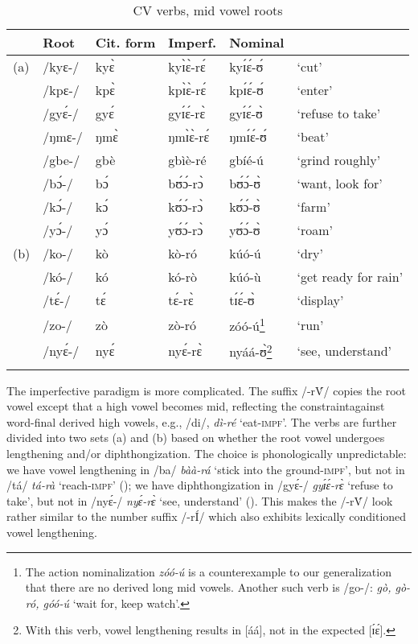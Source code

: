 \documentclass[output=paper,newtxmath,modfonts,nonflat,draftmode]{langsci/langscibook}
\begin{document}
\begin{table}[b]
\begin{tabularx}{\textwidth}{lllllX}
\lsptoprule
& {Root} & {Cit. form} & {Imperf.} & {Nominal} & \\
\midrule
(a) &	/kyɛ-/	&kyɛ̀	&kyɪ̀ɛ̀-rɛ́	&kyɪ́ɛ́-ʊ́	&‘cut’\\
	&/kpɛ-/&	kpɛ̀	&	kpɪ̀ɛ̀-rɛ́	&kpɪ́ɛ́-ʊ́	&‘enter’\\
	&/gyɛ́-/	&gyɛ́	&gyɪ́ɛ́-rɛ̀	&gyɪ́ɛ́-ʊ̀	&‘refuse to take’\\
	&/ŋmɛ-/	&ŋmɛ̀	&ŋmɪ̀ɛ̀-rɛ́	&ŋmɪ́ɛ́-ʊ́	&‘beat’\\
	&/gbe-/&	gbè	&gbìè-ré	&gbíé-ú	&‘grind roughly’\\
	&/bɔ́-/	&bɔ́	&bʊ́ɔ́-rɔ̀	&bʊ́ɔ́-ʊ̀	&‘want, look for’\\
	&/kɔ́-/	&kɔ́	&kʊ́ɔ́-rɔ̀	&kʊ́ɔ́-ʊ̀	&‘farm’\\
	&/yɔ́-/	&yɔ́	&yʊ́ɔ́-rɔ̀ &	yʊ́ɔ́-ʊ̀	&‘roam’\\
\tablevspace
(b)	&/ko-/	&kò	&kò-ró	&kúó-ú	&‘dry’\\
	&/kó-/	&kó	&kó-rò	&kúó-ù	&‘get ready for rain’\\
	&/tɛ́-/	&tɛ́	&tɛ́-rɛ̀	&tɪ́ɛ́-ʊ̀	&‘display’\\
	&/zo-/&	zò	&zò-ró		&zóó-ú\footnote{The action nominalization \textit{zóó-ú} is a counterexample to our generalization that there are no derived long mid vowels.  Another such verb is /go-/: \textit{gò, gò-ró, góó-ú} ‘wait for, keep watch’.} 	&‘run’\\
	&/nyɛ́-/&	nyɛ́	&nyɛ́-rɛ̀ &	nyáá-ʊ̀\footnote{With this verb, vowel lengthening results in [áá], not in the expected [ɪ́ɛ́].}&	‘see, understand’ \\
\lspbottomrule
\end{tabularx}
\caption{CV verbs, mid vowel roots}
\label{tab:anttila:7}
\end{table} 

     The imperfective paradigm is more complicated. The suffix /-r\'{V}/ copies the root vowel except that a high vowel becomes mid, reflecting the constraint\linebreak against word-final derived high vowels, e.g., /di/, \textit{dì-ré} ‘eat-\textsc{impf}’. The verbs are further divided into two sets (a) and (b) based on whether the root vowel undergoes lengthening and/or diphthongization. The choice is phonologically unpredictable: we have vowel lengthening in /ba/ \textit{bàà-rá} ‘stick into the ground-\textsc{impf}’, but not in /tá/ \textit{tá-rà} ‘reach-\textsc{impf}’ ();  we have diphthongization in /gyɛ́-/  \textit{gyɪ́ɛ́-rɛ̀ } ‘refuse to take’, but not in /nyɛ́-/ \textit{nyɛ́-rɛ̀}  ‘see, understand’ (). This makes the  /-r{V́}/ look rather similar to the number suffix /-rÍ/ which also exhibits lexically conditioned vowel lengthening.
\end{document}
